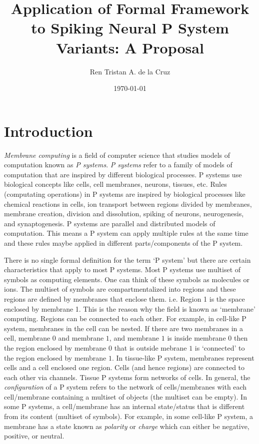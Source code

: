 \documentclass[12pt,A4]{article}
\title
{
   Application of Formal Framework to Spiking Neural P System Variants: A Proposal
}
\author
{
   Ren Tristan A. de la Cruz
}
\date
{
   \today
}
\begin{document}
\maketitle


\section{Introduction}

\emph{Membrane computing} is a field of computer science that studies models of computation known as
\emph{P systems}. \emph{P systems} refer to a family of models of computation that are inspired by 
different biological processes. P systems use biological concepts like cells, cell membranes, neurons, 
tissues, etc. Rules (computating operations) in P systems are inspired by biological processes like
chemical reactions in cells, ion transport between regions divided by membranes, membrane creation,
division and dissolution, spiking of neurons, neurogenesis, and synaptogenesis. P systems are 
parallel and distributed models of computation. This means a P system can apply multiple rules at
the same time and these rules maybe applied in different parts/components of the P system. 

There is no single formal definition for the term `P system' but there are certain characteristics
that apply to most P systems. Most P systems use multiset of symbols as computing elements. One can
think of these symbols as molecules or ions. The multiset of symbols are compartmentalized into 
regions and these regions are defined by membranes that enclose them. i.e. Region 1 is the space
enclosed by membrane 1. This is the reason why the field is known as `membrane' computing. Regions
can be connected to each other. For example, in cell-like P system, membranes in the cell can be
nested. If there are two membranes in a cell, membrane $0$ and membrane $1$, and membrane $1$ is 
inside membrane $0$ then the region enclosed by membrane $0$ that is outside mebrane $1$ is 
`connected' to the region enclosed by membrane $1$. In tissue-like P system, membranes represent 
cells and a cell enclosed one region. Cells (and hence regions) are connected to each other via 
channels. Tissue P systems form networks of cells. In general, the \emph{configuration} of a P 
system refers to the network of cells/membranes with each cell/membrane containing a multiset of 
objects (the multiset can be empty). In some P systems, a cell/membrane has an internal state/status
that is different from its content (multiset of symbols). For example, in some cell-like P system, 
a membrane has a state known as \emph{polarity} or \emph{charge} which can either be negative, 
positive, or neutral.
\end{document}
